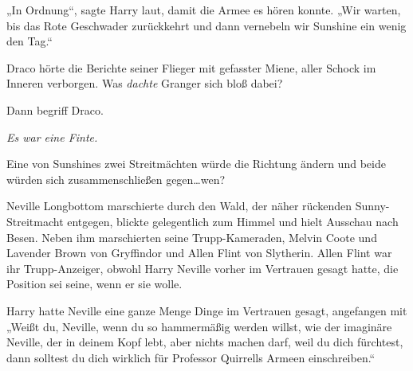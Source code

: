 „In Ordnung“, sagte Harry laut, damit die Armee es hören konnte.
„Wir warten, bis das Rote Geschwader zurückkehrt und dann vernebeln wir Sunshine ein wenig den Tag.“

\later

Draco hörte die Berichte seiner Flieger mit gefasster Miene, aller Schock im Inneren verborgen. Was \emph{dachte} Granger sich bloß dabei?

Dann begriff Draco.

\emph{Es war eine Finte.}

Eine von Sunshines zwei Streitmächten würde die Richtung ändern und beide würden sich zusammenschließen gegen…wen?

\later

Neville Longbottom marschierte durch den Wald, der näher rückenden Sunny-Streitmacht entgegen, blickte gelegentlich zum Himmel und hielt Ausschau nach Besen. Neben ihm marschierten seine Trupp-Kameraden, Melvin Coote und Lavender Brown von Gryffindor und Allen Flint von Slytherin. Allen Flint war ihr Trupp-Anzeiger, obwohl Harry Neville vorher im Vertrauen gesagt hatte, die Position sei seine, wenn er sie wolle.

Harry hatte Neville eine ganze Menge Dinge im Vertrauen gesagt, angefangen mit
„Weißt du, Neville, wenn du so hammermäßig werden willst, wie der imaginäre Neville, der in deinem Kopf lebt, aber nichts machen darf, weil du dich fürchtest, dann solltest du dich wirklich für Professor Quirrells Armeen einschreiben.“

